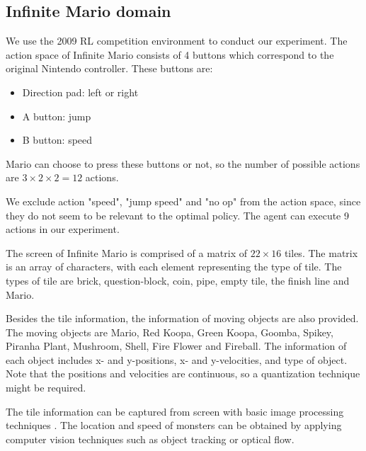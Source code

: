 
\subsection{Infinite Mario domain}

We use the 2009 RL competition environment to conduct our experiment.
The action space of Infinite Mario consists of 4 buttons which correspond
to the original Nintendo controller.
These buttons are:
\begin{itemize}
\item Direction pad: left or right
\item A button: jump
\item B button: speed
\end{itemize}
Mario can choose to press these buttons or not, so
the number of possible actions are $3 \times 2 \times 2 = 12$ actions.  

We exclude action "speed", "jump speed" and "no op" from the 
action space, since they do not seem to be relevant to the optimal policy.
The agent can execute 9 actions in our experiment.


The screen of Infinite Mario is comprised of a matrix of $22 \times 16$ tiles.
The matrix is an array of characters, with each element representing the type of tile.
The types of tile are brick, question-block, coin, pipe, empty tile, the finish line and Mario.

Besides the tile information, the information of moving objects are also provided. 
The moving objects are Mario, Red Koopa, Green Koopa, Goomba, Spikey, Piranha Plant, Mushroom, Shell, Fire Flower and Fireball.
The information of each object includes x- and y-positions, x- and y-velocities, and type of object.
Note that the positions and velocities are continuous, so a quantization technique might be required.

The tile information can be captured from screen with basic image processing techniques \cite{Yavar}.
The location and speed of monsters can be obtained by applying computer vision techniques such
as object tracking or optical flow.

